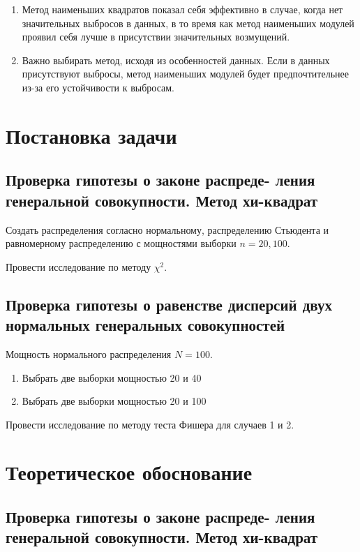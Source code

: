 \documentclass[12pt,a4paper]{article}
\begin{document}
	\begin{enumerate}
		\item Метод наименьших квадратов показал себя эффективно в случае,
		когда нет значительных выбросов в данных, в то время как метод
		наименьших модулей проявил себя лучше в присутствии значительных
		возмущений.
		\item Важно выбирать метод, исходя из особенностей данных. Если в
		данных присутствуют выбросы, метод наименьших модулей будет
		предпочтительнее из-за его устойчивости к выбросам.
	\end{enumerate}

	\section{Постановка задачи}

	\subsection{Проверка гипотезы о законе распреде- ления генеральной
		совокупности. Метод хи-квадрат}

	Создать распределения согласно нормальному, распределению Стьюдента и
	равномерному распределению с мощностями выборки \( n=20, 100 \).

	Провести исследование по методу \( \chi^2 \).

	\subsection{Проверка гипотезы о равенстве дисперсий двух нормальных
		генеральных совокупностей}

		Мощность нормального распределения \( N = 100 \).

		\begin{enumerate}
			\item Выбрать две выборки мощностью 20 и 40
			\item Выбрать две выборки мощностью 20 и 100
		\end{enumerate}

		Провести исследование по методу теста Фишера для случаев 1 и 2.

		\section{Теоретическое обоснование}

		\subsection{Проверка гипотезы о законе распреде- ления генеральной
			совокупности. Метод хи-квадрат}
\end{document}
